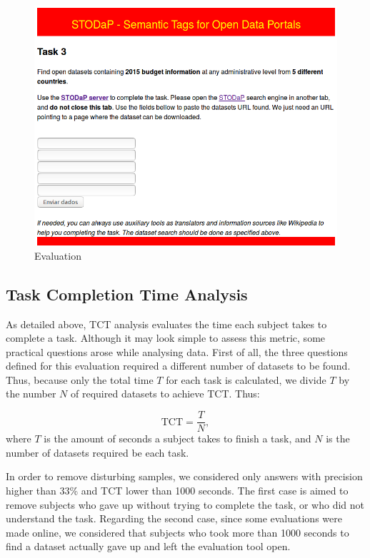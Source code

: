 \begin{figure}[h!]
\begin{center}
\includegraphics[width=\columnwidth]{images/eval_screenshot.png}
\caption[Evaluation]{Evaluation}
\label{fig:eval_screenshot}
\end{center}
\end{figure}

\subsection{Task Completion Time Analysis}

As detailed above, TCT analysis evaluates the time each subject takes to complete a task.
Although it may look simple to assess this metric, some practical questions arose while analysing data.
First of all, the three questions defined for this evaluation required a different number of datasets to be found.
Thus, because only the total time $T$ for each task is calculated, we divide $T$ by the number $N$ of required datasets to achieve TCT. Thus:

\begin{equation}
	\textrm{TCT} = \frac{T}{N},
\end{equation}
where $T$ is the amount of seconds a subject takes to finish a task, and $N$ is the number of datasets required be each task.

In order to remove disturbing samples, we considered only answers with precision higher than 33\% and TCT lower than 1000 seconds.
The first case is aimed to remove subjects who gave up without trying to complete the task, or who did not understand the task.
Regarding the second case, since some evaluations were made online, we considered that subjects who took more than 1000 seconds to find a dataset actually gave up and left the evaluation tool open.

